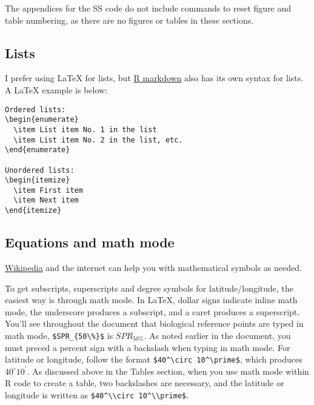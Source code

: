 \documentclass[12pt,]{article}
\begin{document}
\vspace{.5cm}

The appendices for the SS code do not include commands to reset figure
and table numbering, as there are no figures or tables in these
sections.

\subsection{Lists}\label{lists}

I prefer using LaTeX for lists, but
\href{http://rmarkdown.rstudio.com/authoring_basics.html}{R markdown}
also has its own syntax for lists. A LaTeX example is below:

\begin{Verbatim}[frame=single]
Ordered lists:
\begin{enumerate}
  \item List item No. 1 in the list
  \item List item No. 2 in the list, etc.
\end{enumerate} 

Unordered lists:
\begin{itemize}
  \item First item
  \item Next item
\end{itemize} 
\end{Verbatim}

\subsection{Equations and math mode}\label{equations-and-math-mode}

\href{https://en.wikibooks.org/wiki/LaTeX/Mathematics}{Wikipedia} and
the internet can help you with mathematical symbols as needed.

To get subscripts, superscripts and degree symbols for
latitude/longitude, the easiest way is through math mode. In LaTeX,
dollar signs indicate inline math mode, the underscore produces a
subscript, and a caret produces a superscript. You'll see throughout the
document that biological reference points are typed in math mode,
\verb|$SPR_{50\%}$| is \(SPR_{50\%}\). As noted earlier in the document,
you must preced a percent sign with a backslash when typing in math
mode. For latitude or longitude, follow the format
\verb|$40^\circ 10^\prime$|, which produces \(40^\circ 10^\prime\). As
discussed above in the Tables section, when you use math mode within R
code to create a table, two backslashes are necessary, and the latitude
or longitude is written as \verb|$40^\\circ 10^\\prime$|.
\end{document}
